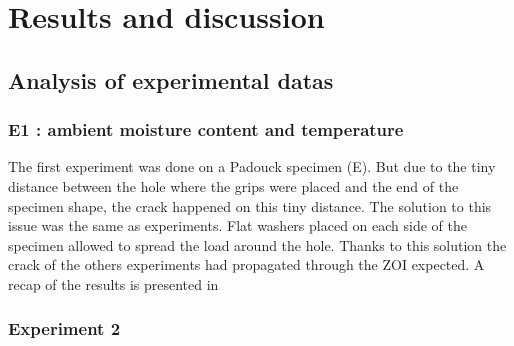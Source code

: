 
\chapter{Results and discussion} %

\label{Chapter3} %


\section{Analysis of experimental datas}



\subsection{E1 : ambient moisture content and temperature}

The first experiment was done on a Padouck specimen (E). But due to the tiny distance between the hole where the grips were placed and the end of the specimen shape, the crack happened on this tiny distance. The solution to this issue was the same as \parencite{Reference7} experiments. Flat washers placed on each side of the specimen allowed to spread the load around the hole. Thanks to this solution the crack of the others experiments had propagated through the ZOI expected. A recap of the results is presented in %
%
%
%


\subsection{Experiment 2}

